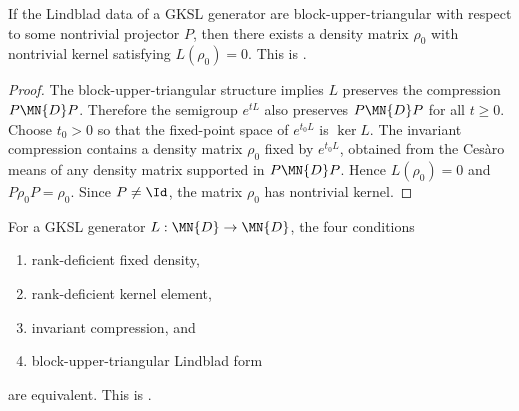 \begin{theorem}
    \label{thm:blockUpperTriangular_implies_rankDeficient}
    \leanok
    If the Lindblad data of a GKSL generator are block-upper-triangular
    with respect to some nontrivial projector $P$,
    then there exists a density matrix $\rho_0$ with nontrivial kernel
    satisfying $L(\rho_0)=0$.
    This is \cite[Proposition~7.6, (4)$\Rightarrow$(2)]{Wolf2012Quantum}.
\end{theorem}

\begin{proof}
    \leanok
    The block-upper-triangular structure implies $L$ preserves the
    compression $P\MN{D}P$.
    Therefore the semigroup $e^{tL}$ also preserves $P\MN{D}P$
    for all $t\ge0$.  Choose $t_0>0$ so that the fixed-point space of
    $e^{t_0L}$ is $\ker L$.  The invariant compression contains a density
    matrix $\rho_0$ fixed by $e^{t_0L}$, obtained from the Cesàro means of
    any density matrix supported in $P\MN{D}P$.  Hence
    $L(\rho_0)=0$ and $P\rho_0P=\rho_0$.  Since $P\neq\Id$, the matrix
    $\rho_0$ has nontrivial kernel.
\end{proof}

\begin{theorem}
    \label{thm:wolf_prop_7_6_full}
    \leanok
    For a GKSL generator $L:\MN{D}\to\MN{D}$, the four conditions
    \begin{enumerate}
        \item rank-deficient fixed density,
        \item rank-deficient kernel element,
        \item invariant compression, and
        \item block-upper-triangular Lindblad form
    \end{enumerate}
    are equivalent.
    This is \cite[Proposition~7.6]{Wolf2012Quantum}.
\end{theorem}

